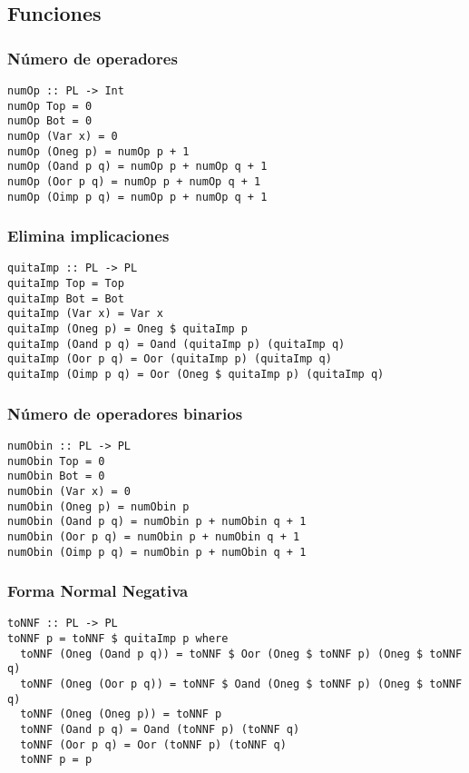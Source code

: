 \documentclass[11pt]{article}
\begin{document}
\subsection{Funciones}
\label{sec:org66ef227}
\subsubsection{Número de operadores}
\label{sec:orge026b03}
\begin{verbatim}
numOp :: PL -> Int
numOp Top = 0
numOp Bot = 0
numOp (Var x) = 0
numOp (Oneg p) = numOp p + 1
numOp (Oand p q) = numOp p + numOp q + 1
numOp (Oor p q) = numOp p + numOp q + 1
numOp (Oimp p q) = numOp p + numOp q + 1
\end{verbatim}
\subsubsection{Elimina implicaciones}
\label{sec:org9fde8b0}
\begin{verbatim}
quitaImp :: PL -> PL
quitaImp Top = Top
quitaImp Bot = Bot
quitaImp (Var x) = Var x
quitaImp (Oneg p) = Oneg $ quitaImp p
quitaImp (Oand p q) = Oand (quitaImp p) (quitaImp q)
quitaImp (Oor p q) = Oor (quitaImp p) (quitaImp q)
quitaImp (Oimp p q) = Oor (Oneg $ quitaImp p) (quitaImp q)
\end{verbatim}
\subsubsection{Número de operadores binarios}
\label{sec:orgdfe1711}
\begin{verbatim}
numObin :: PL -> PL
numObin Top = 0
numObin Bot = 0
numObin (Var x) = 0
numObin (Oneg p) = numObin p
numObin (Oand p q) = numObin p + numObin q + 1
numObin (Oor p q) = numObin p + numObin q + 1
numObin (Oimp p q) = numObin p + numObin q + 1
\end{verbatim}
\subsubsection{Forma Normal Negativa}
\label{sec:org73a7fa9}
\begin{verbatim}
toNNF :: PL -> PL
toNNF p = toNNF $ quitaImp p where
  toNNF (Oneg (Oand p q)) = toNNF $ Oor (Oneg $ toNNF p) (Oneg $ toNNF q)
  toNNF (Oneg (Oor p q)) = toNNF $ Oand (Oneg $ toNNF p) (Oneg $ toNNF q)
  toNNF (Oneg (Oneg p)) = toNNF p
  toNNF (Oand p q) = Oand (toNNF p) (toNNF q)
  toNNF (Oor p q) = Oor (toNNF p) (toNNF q)
  toNNF p = p
\end{verbatim}
\end{document}
